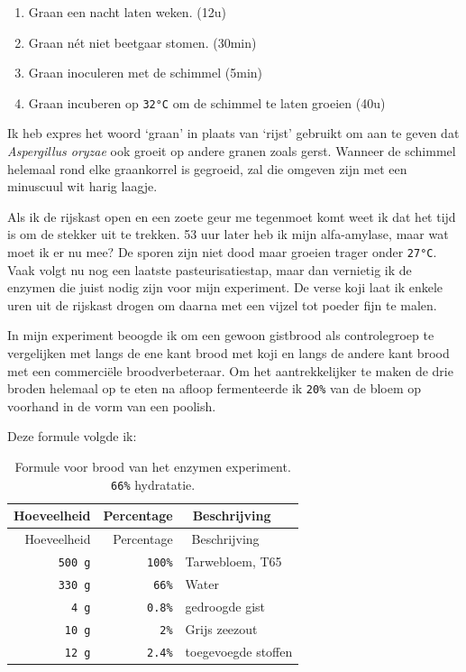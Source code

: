 \documentclass[
  11pt,
  dutch,
]{memoir}
\providecommand{\tightlist}{%
  \setlength{\itemsep}{0pt}\setlength{\parskip}{0pt}}
\begin{document}
\begin{enumerate}
\def\labelenumi{\arabic{enumi}.}
\tightlist
\item
  Graan een nacht laten weken. (12u)
\item
  Graan nét niet beetgaar stomen. (30min)
\item
  Graan inoculeren met de schimmel (5min)
\item
  Graan incuberen op \texttt{32°C} om de schimmel te laten groeien (40u)
\end{enumerate}

Ik heb expres het woord `graan' in plaats van `rijst' gebruikt om aan te
geven dat \emph{Aspergillus oryzae} ook groeit op andere granen zoals
gerst. Wanneer de schimmel helemaal rond elke graankorrel is gegroeid,
zal die omgeven zijn met een minuscuul wit harig laagje.

Als ik de rijskast open en een zoete geur me tegenmoet komt weet ik dat
het tijd is om de stekker uit te trekken. 53 uur later heb ik mijn
alfa-amylase, maar wat moet ik er nu mee? De sporen zijn niet dood maar
groeien trager onder \texttt{27°C}. Vaak volgt nu nog een laatste
pasteurisatiestap, maar dan vernietig ik de enzymen die juist nodig zijn
voor mijn experiment. De verse koji laat ik enkele uren uit de rijskast
drogen om daarna met een vijzel tot poeder fijn te malen.

In mijn experiment beoogde ik om een gewoon gistbrood als controlegroep
te vergelijken met langs de ene kant brood met koji en langs de andere
kant brood met een commerciële broodverbeteraar. Om het aantrekkelijker
te maken de drie broden helemaal op te eten na afloop fermenteerde ik
\texttt{20\%} van de bloem op voorhand in de vorm van een poolish.

Deze formule volgde ik:

\begin{longtable}[]{@{}rrl@{}}
\caption{Formule voor brood van het enzymen experiment. \texttt{66\%}
hydratatie.}\tabularnewline
\toprule
Hoeveelheid & Percentage & ~Beschrijving\tabularnewline
\midrule
\endfirsthead
\toprule
Hoeveelheid & Percentage & ~Beschrijving\tabularnewline
\midrule
\endhead
\texttt{500\ g} & \texttt{100\%} & Tarwebloem, T65\tabularnewline
\texttt{330\ g} & \texttt{66\%} & Water\tabularnewline
\texttt{4\ g} & \texttt{0.8\%} & gedroogde gist\tabularnewline
\texttt{10\ g} & \texttt{2\%} & Grijs zeezout\tabularnewline
\texttt{12\ g} & \texttt{2.4\%} & toegevoegde stoffen\tabularnewline
\bottomrule
\end{longtable}
\end{document}

